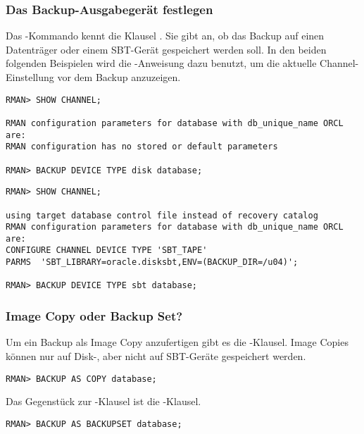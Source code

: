         \subsubsection{Das Backup-Ausgabeger\"at festlegen}
          Das -Kommando kennt die Klausel . Sie gibt an, ob das Backup auf einen Datentr\"ager oder einem SBT-Ger\"at gespeichert werden soll. In den beiden folgenden Beispielen wird die -Anweisung dazu benutzt, um die aktuelle Channel-Einstellung vor dem Backup anzuzeigen.
\clearpage
          \begin{lstlisting}[caption={Ein Backup to Disk},label=admin1302,language=rman]
RMAN> SHOW CHANNEL;

RMAN configuration parameters for database with db_unique_name ORCL are:
RMAN configuration has no stored or default parameters

RMAN> BACKUP DEVICE TYPE disk database;
          \end{lstlisting}
          \begin{lstlisting}[caption={Ein Backup to Tape},label=admin1303,language=rman]
RMAN> SHOW CHANNEL;

using target database control file instead of recovery catalog
RMAN configuration parameters for database with db_unique_name ORCL are:
CONFIGURE CHANNEL DEVICE TYPE 'SBT_TAPE'
PARMS  'SBT_LIBRARY=oracle.disksbt,ENV=(BACKUP_DIR=/u04)';

RMAN> BACKUP DEVICE TYPE sbt database;
          \end{lstlisting}
        \subsubsection{Image Copy oder Backup Set?}
          Um ein Backup als Image Copy anzufertigen gibt es die -Klausel. Image Copies k\"onnen nur auf Disk-, aber nicht auf SBT-Ger\"ate gespeichert werden.
          \begin{lstlisting}[caption={Eine Image Copy der Datenbank erstellen},label=admin1304,language=rman]
RMAN> BACKUP AS COPY database;
          \end{lstlisting}
          Das Gegenst\"uck zur -Klausel ist die -Klausel.
          \begin{lstlisting}[caption={Ein Backup Set der Datenbank erstellen},label=admin1305,language=rman]
RMAN> BACKUP AS BACKUPSET database;
        \end{lstlisting}
